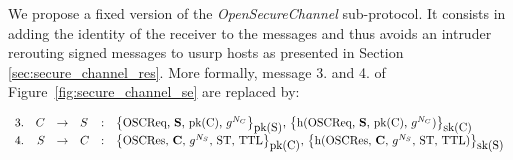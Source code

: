 We propose a fixed version of the {\em OpenSecureChannel} sub-protocol.
It consists in adding the identity of the receiver to the messages and thus 
avoids an intruder rerouting signed messages to usurp hosts as presented
in Section \ref{sec:secure_channel_res}.
More formally, message 3. and 4. of Figure~\ref{fig:secure_channel_se} are replaced
by:
\vspace{-1.5em}
\arraycolsep=1.4pt
\begin{flushleft}
    \[\begin{array}{lrllll}
        3. & C & \rightarrow & S & : & \text{\sm{\oscreq, {\bf S}, pk(C), $g^{N_{C}}$}{pk(S)}{sk(C)}}\\
        4. & S & \rightarrow & C & : & \text{\sm{\oscres, {\bf C}, $g^{N_{S}}$, ST, TTL}{pk(C)}{sk(S)}}\\
    \end{array}\]
\end{flushleft}
\vspace{-1em}

%
%
%
%                
%                
%
%
%
%
%
%

